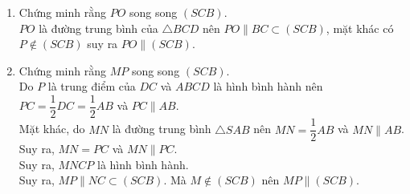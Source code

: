 \begin{bt}
{\begin{enumerate}
			\item Chứng minh rằng $PO$ song song $(SCB)$.\\
			$PO$ là đường trung bình của $\triangle BCD$ nên $PO\parallel BC\subset (SCB)$, mặt khác có $P\notin (SCB)$ suy ra $PO\parallel (SCB)$.
			
			\item Chứng minh rằng $MP$ song song $(SCB)$.\\
			Do $P$ là trung điểm của $DC$ và $ABCD$ là hình bình hành nên $PC=\dfrac{1}{2}DC=\dfrac{1}{2}AB$ và $PC\parallel AB$.\\
			Mặt khác, do $MN$ là đường trung bình $\triangle SAB$ nên $MN=\dfrac{1}{2}AB$ và $MN\parallel AB$.\\
			Suy ra, $MN=PC$ và $MN\parallel PC$.\\
			Suy ra, $MNCP$ là hình bình hành.\\
			Suy ra, $MP\parallel NC\subset (SCB)$. Mà $M\notin (SCB)$ nên $MP\parallel (SCB)$.
		\end{enumerate}
	}
\end{bt}


